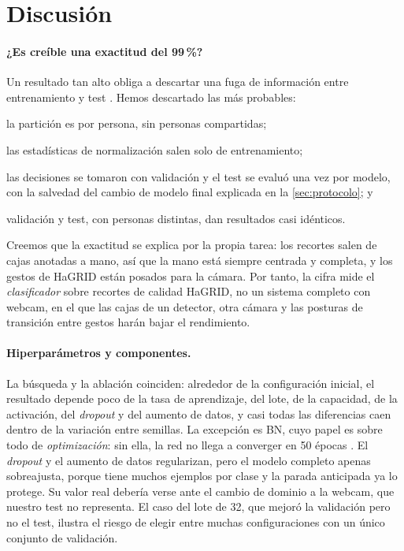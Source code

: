 \section{Discusión}
\label{sec:discusion}

\paragraph{¿Es creíble una exactitud del 99\,\%?}
Un resultado tan alto obliga a descartar una fuga de información entre entrenamiento y test
\citep{kaufman2012leakage}. Hemos descartado las más probables:
\begin{enumerate*}[label=(\roman*)]
  \item la partición es por persona, sin personas compartidas;
  \item las estadísticas de normalización salen solo de entrenamiento;
  \item las decisiones se tomaron con validación y el test se evaluó una vez por modelo, con la
    salvedad del cambio de modelo final explicada en la \cref{sec:protocolo}; y
  \item validación y test, con personas distintas, dan resultados casi idénticos.
\end{enumerate*}
Creemos que la exactitud se explica por la propia tarea: los recortes salen de cajas anotadas a
mano, así que la mano está siempre centrada y completa, y los gestos de HaGRID están posados para
la cámara. Por tanto, la cifra mide el \emph{clasificador} sobre recortes de calidad HaGRID, no
un sistema completo con webcam, en el que las cajas de un detector, otra cámara y las posturas de
transición entre gestos harán bajar el rendimiento.

\paragraph{Hiperparámetros y componentes.}
La búsqueda y la ablación coinciden: alrededor de la configuración inicial, el resultado depende
poco de la tasa de aprendizaje, del lote, de la capacidad, de la activación, del \emph{dropout} y
del aumento de datos, y casi todas las diferencias caen dentro de la variación entre semillas. La
excepción es BN, cuyo papel es sobre todo de \emph{optimización}: sin ella, la red no llega a
converger en 50 épocas \citep{ioffe2015bn}. El \emph{dropout} y el aumento de datos regularizan,
pero el modelo completo apenas sobreajusta, porque tiene muchos ejemplos por clase y la parada
anticipada ya lo protege. Su valor real debería verse ante el cambio de dominio a la webcam, que
nuestro test no representa. El caso del lote de 32, que mejoró la validación pero no el test,
ilustra el riesgo de elegir entre muchas configuraciones con un único conjunto de validación.

